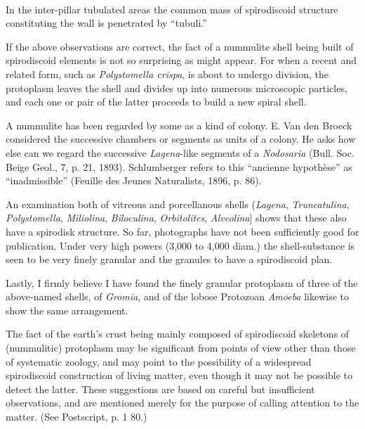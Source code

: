 \documentclass[a4paper, 12pt, oneside]{article}
\begin{document}
\paragraph{}
In the inter-pillar tubulated areas the common mass of spirodiscoid structure constituting the wall is penetrated by ``tubuli.''

If the above observations are correct, the fact of a nummulite shell being built of spirodiscoid elements is not so surprising as might appear. For when a recent and related form, such as \emph{Polystomella crispa}, is about to undergo division, the protoplasm leaves the shell and divides up into numerous microscopic particles, and each one or pair of the latter proceeds to build a new spiral shell.

A nummulite has been regarded by some as a kind of colony. E. Van den Broeck considered the successive chambers or segments as units of a colony. He asks how else can we regard the successive \emph{Lagena}-like segments of a \emph{Nodosaria} (Bull. Soc. Beige Geol., 7, p. 21, 1893). Schlumberger refers to this ``ancienne hypothèse'' as ``inadmissible'' (Feuille des Jeunes Naturalists, 1896, p. 86).

An examination both of vitreous and porcellanous shells (\emph{Lagena}, \emph{Truncatulina}, \emph{Polystomella}, \emph{Miliolina}, \emph{Biloculina}, \emph{Orbitolites}, \emph{Alveolina}] shows that these also have a spirodisk structure. So far, photographs have not been sufficiently good for publication. Under very high powers (3,000 to 4,000 diam.) the shell-substance is seen to be very finely granular and the granules to have a spirodiscoid plan.

Lastly, I firmly believe I have found the finely granular protoplasm of three of the above-named shells, of \emph{Gromia}, and of the lobose Protozoan \emph{Amoeba} likewise to show the same arrangement.

The fact of the earth's crust being mainly composed of spirodiscoid skeletons of (nummulitic) protoplasm may be significant from points of view other than those of systematic zoology, and may point to the possibility of a widespread spirodiscoid construction of living matter, even though it may not be possible to detect the latter. These suggestions are based on careful but insufficient observations, and are mentioned merely for the purpose of calling attention to the matter. (See Postscript, p. 1 80.)
\end{document}
